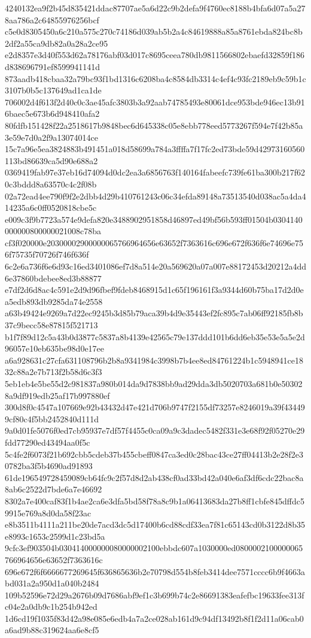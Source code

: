 {4240132ea9f2b45d835421ddac87707ae5a6d22c9b2defa9f4760ec8188b4bfa6d07a5a278aa786a2c64855976256bcf
c5e0d8305450a6c210a575c270c74186d039ab5b2a4c84619888a85a8761ebda824bc8b2df2a55ca9db82a0a28a2ce95
e2d8357e3d40f553d62a78176abf03d017c8695ceea780db9811566802ebaefd32859f186d838696791ef8599941141d
873aadb418cbaa32a79bc93f1bd1316c6208ba4c8584db3314c4ef4c93fc2189eb9c59b1c3107b0b5c137649ad1ca1de
706002d4f613f2d40c0c3ae45afc3803b3a92aab74785493e80061dce953bde946ec13b916baec5e673b6d948410afa2
80fdfb151428f22a2518617b9848bec6d645338c05e8ebb778eed5773267f594e7f42b85a3e59e7d0a2f9a13074014ce
15c7a96e5ea3824883b491451a018d58699a784a3ffffa7f17fc2ed73bde59d42973160560113bd86639ca5d90e688a2
0369419fab97e37eb16d74094d0dc2ea3a6856763f140164fabeefc739fe61ba300b217f620c3bddd8a63570c4c2f08b
02a72ead4ee790f9f2e2dbb4d29b410761243c06c34efda89148a73513540d038ac5a4da414235a6c0ff0520818cbe5c
e009c3f9b7723a574e9defa820e3488902951858d46897ed49bf56b593ff01504b0304140000000800000021008c78ba
cf3f020000e20300002900000065766964656e63652f7363616c696e672f636f6e74696e756f75735f70726f746f636f
6c2e6a736f6e6d93c16ed3401086ef7d8a514e20a569620a07a007e88172453d20212a4dd6e37860bdebee8ed3b88877
e7df2d6d8ac4c591e2d9d96fbef9fdeb8468915d1c65f196161f3a9344d60b75ba17d2d0ea5edb893db9285da74e2558
a63b49424e9269a7d22ec9245b3d85b79aca39b4d9e35443ef2fc895c7ab06ff92185fb8b37c9becc58e87815f521713
b1f7f89d12c5a43b0d3877c5837a8b4139e42565c79e137ddd101b6dd6eb35e53e5a5e2d96057e10eb635be98d0e17ee
a6a928631c27cfa631108796b2b8a9341984c3998b7b4ee8ed84761224b1c5948941ce1832c88a2e7b713f2b58d6c3f3
5eb1eb4e5be55d2c981837a980b014da9d7838bb9ad29dda3db5020703a681b0e503028a9df919edb25af17b997880ef
300d8f0c4547a107669e92b43432d47e421d706b9747f2155df73257e8246019a39f434499cf80c4f5bb2452840d111d
9a0d01fe5076f0ed7cb95937e7df57f4455c0ca09a9c3dadec5482f331e3e68f92f05270e29fdd77290ed43494aa0f5c
5c4fe2f6073f21b692cbb5cdeb37b455cbeff0847ca3ed0c28bac43ce27ff04413b2e28f2e30782ba3f5b4690ad91893
61de196549728459089cb64fc9c2f57d8d2ab438cf0ad33bd42a040e6af3df6cdc22bac8a8ab6c2522d7bde6a7e46692
8302a7e400caf83f1b4ae2ca6e3dfa5bd58f78a8c9b1a06413683da27b8ff1cbfe845dffdc59915e769a8d0da58f23ac
e8b3511b4111a211be20de7acd3dc5d17400b6cd88cdf33ea7f81c65143cd0b3122d8b35e8993c1653c2599d1c23bd5a
9cfc3ef903504b030414000000080000002100ebbdc607a1030000ed0800002100000065766964656e63652f7363616c
696e672f6f6666677269645f636865636b2e70798d554b8feb3414dee7571cccc6b9f4663abd031a2a950d1a040b2484
109b52596e72d29a2676b09d7686abf9ef1c3b699b74c2e86691383eafefbc19633fee313fc04e2a0db9c1b254b942ed
1d6cd19f1035f83d42a98e085e6edb4a7a2ce028ab161d9c94df13492b8f1f2d11a06cab0a6ad9b88c319624aa6e8cf5
}
